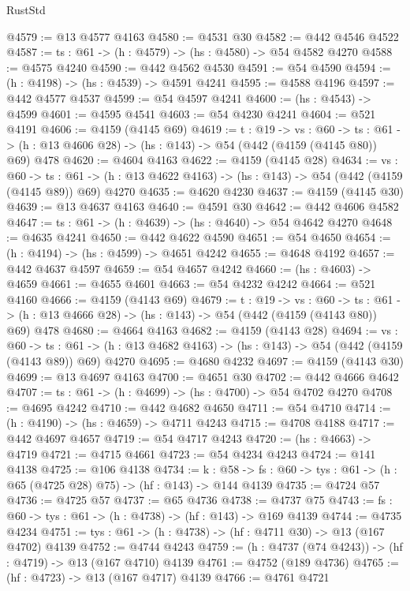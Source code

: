 \begin{lexlean}{RustStd}
\begin{coremodule}
@4579 := @13 @4577 @4163
@4580 := @4531 @30
@4582 := @442 @4546 @4522
@4587 := {ts : @61} -> (h : @4579) -> (hs : @4580) -> @54 @4582 @4270
@4588 := @4575 @4240
@4590 := @442 @4562 @4530
@4591 := @54 @4590
@4594 := (h : @4198) -> (hs : @4539) -> @4591 @4241
@4595 := @4588 @4196
@4597 := @442 @4577 @4537
@4599 := @54 @4597 @4241
@4600 := (hs : @4543) -> @4599
@4601 := @4595 @4541
@4603 := @54 @4230 @4241
@4604 := @521 @4191
@4606 := @4159 (@4145 @69)
@4619 := {t : @19} ->
  {vs : @60} ->
  {ts : @61} -> (h : @13 @4606 @28) -> (hs : @143) -> @54 (@442 (@4159 (@4145 @80)) @69) @478
@4620 := @4604 @4163
@4622 := @4159 (@4145 @28)
@4634 := {vs : @60} ->
  {ts : @61} -> (h : @13 @4622 @4163) -> (hs : @143) -> @54 (@442 (@4159 (@4145 @89)) @69) @4270
@4635 := @4620 @4230
@4637 := @4159 (@4145 @30)
@4639 := @13 @4637 @4163
@4640 := @4591 @30
@4642 := @442 @4606 @4582
@4647 := {ts : @61} -> (h : @4639) -> (hs : @4640) -> @54 @4642 @4270
@4648 := @4635 @4241
@4650 := @442 @4622 @4590
@4651 := @54 @4650
@4654 := (h : @4194) -> (hs : @4599) -> @4651 @4242
@4655 := @4648 @4192
@4657 := @442 @4637 @4597
@4659 := @54 @4657 @4242
@4660 := (hs : @4603) -> @4659
@4661 := @4655 @4601
@4663 := @54 @4232 @4242
@4664 := @521 @4160
@4666 := @4159 (@4143 @69)
@4679 := {t : @19} ->
  {vs : @60} ->
  {ts : @61} -> (h : @13 @4666 @28) -> (hs : @143) -> @54 (@442 (@4159 (@4143 @80)) @69) @478
@4680 := @4664 @4163
@4682 := @4159 (@4143 @28)
@4694 := {vs : @60} ->
  {ts : @61} -> (h : @13 @4682 @4163) -> (hs : @143) -> @54 (@442 (@4159 (@4143 @89)) @69) @4270
@4695 := @4680 @4232
@4697 := @4159 (@4143 @30)
@4699 := @13 @4697 @4163
@4700 := @4651 @30
@4702 := @442 @4666 @4642
@4707 := {ts : @61} -> (h : @4699) -> (hs : @4700) -> @54 @4702 @4270
@4708 := @4695 @4242
@4710 := @442 @4682 @4650
@4711 := @54 @4710
@4714 := (h : @4190) -> (hs : @4659) -> @4711 @4243
@4715 := @4708 @4188
@4717 := @442 @4697 @4657
@4719 := @54 @4717 @4243
@4720 := (hs : @4663) -> @4719
@4721 := @4715 @4661
@4723 := @54 @4234 @4243
@4724 := @141 @4138
@4725 := @106 @4138
@4734 := {k : @58} ->
  {fs : @60} -> {tys : @61} -> (h : @65 (@4725 @28) @75) -> (hf : @143) -> @144 @4139
@4735 := @4724 @57
@4736 := @4725 @57
@4737 := @65 @4736
@4738 := @4737 @75
@4743 := {fs : @60} -> {tys : @61} -> (h : @4738) -> (hf : @143) -> @169 @4139
@4744 := @4735 @4234
@4751 := {tys : @61} -> (h : @4738) -> (hf : @4711 @30) -> @13 (@167 @4702) @4139
@4752 := @4744 @4243
@4759 := (h : @4737 (@74 @4243)) -> (hf : @4719) -> @13 (@167 @4710) @4139
@4761 := @4752 (@189 @4736)
@4765 := (hf : @4723) -> @13 (@167 @4717) @4139
@4766 := @4761 @4721

\end{coremodule}
\end{lexlean}
